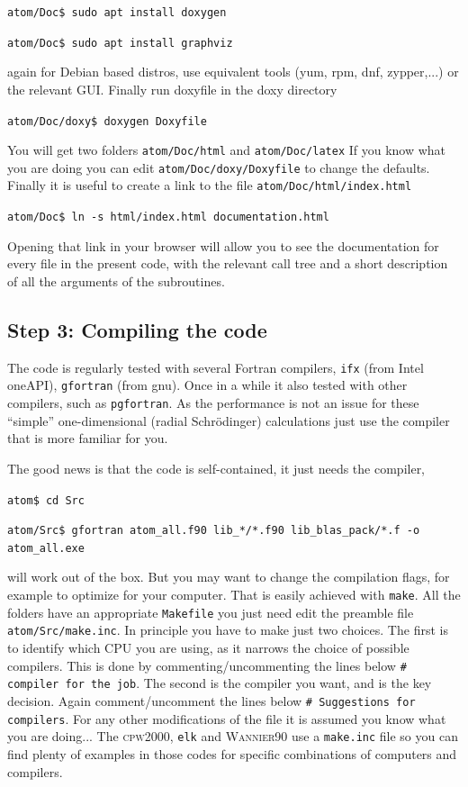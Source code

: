 \documentclass[11pt]{article}
\begin{document}
\noindent\texttt{atom/Doc\$ sudo apt install doxygen}

\noindent\texttt{atom/Doc\$ sudo apt install graphviz}

again for Debian based distros, use equivalent tools (yum, rpm, dnf, zypper,...) or the relevant GUI.
Finally run doxyfile in the doxy directory

\noindent\texttt{atom/Doc/doxy\$ doxygen Doxyfile}

You will get two folders \texttt{atom/Doc/html} and \texttt{atom/Doc/latex}
If you know what you are doing you can edit \texttt{atom/Doc/doxy/Doxyfile}
to change the defaults.
Finally it is useful to create a link to the file \texttt{atom/Doc/html/index.html}

\noindent\texttt{atom/Doc\$ ln -s html/index.html documentation.html}

Opening that link in your browser will allow you to see the documentation for every file in the present code,
with the relevant call tree and a short description of all the arguments of the subroutines.

\subsection{Step 3: Compiling the code}
\label{sec:step3}

The code is regularly tested with several Fortran compilers, \texttt{ifx} (from Intel oneAPI),
\texttt{gfortran} (from gnu).  Once in a while it also tested with other compilers, such as
\texttt{pgfortran}.
As the performance is not an issue for these ``simple'' one-dimensional (radial Schrödinger) calculations
just use the compiler that is more familiar for you.

The good news is that the code is self-contained, it just needs the compiler,

\noindent\texttt{atom\$ cd Src}

\noindent\texttt{atom/Src\$ gfortran atom\_all.f90 lib\_*/*.f90 lib\_blas\_pack/*.f -o atom\_all.exe}

will work out of the box.  But you may want to change the compilation flags,
for example to optimize for your computer.  That is easily
achieved with \texttt{make}.  All the folders have an appropriate
\texttt{Makefile} you just need edit the preamble file \texttt{atom/Src/make.inc}.
In principle you have to make just two choices.  The first is to identify which CPU you are using,
as it narrows the choice of possible compilers.  This is done by commenting/uncommenting
the lines below \texttt{\#   compiler for the job}.
The second is the compiler you want, and is the key decision.  Again comment/uncomment the lines below
\texttt{\#   Suggestions for compilers}.
For any other modifications of the file it is assumed you know what you are doing...
The \textsc{cpw2000}, \texttt{elk} and \textsc{Wannier90} use a \texttt{make.inc} file
so you can find plenty of examples in those codes for specific
combinations of computers and compilers.
\end{document}
